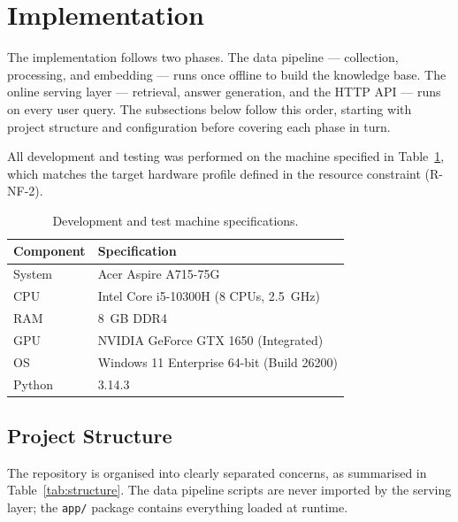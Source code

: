 \section{Implementation}
\label{sec:impl}

The implementation follows two phases. The data pipeline --- collection,
processing, and embedding --- runs once offline to build the knowledge base.
The online serving layer --- retrieval, answer generation, and the HTTP API
--- runs on every user query. The subsections below follow this order,
starting with project structure and configuration before covering each
phase in turn.

All development and testing was performed on the machine specified in
Table~\ref{tab:dev-machine}, which matches the target hardware profile
defined in the resource constraint (R-NF-2).


\begin{table}[H]
    \centering
    \begin{tabular}{|m{}|m{}|}
        \hline
        \textbf{Component} & \textbf{Specification} \\
        \hline\hline
        System     & Acer Aspire A715-75G \\
        \hline
        CPU        & Intel Core i5-10300H (8 CPUs, 2.5~GHz) \\
        \hline
        RAM        & 8~GB DDR4 \\
        \hline
        GPU        & NVIDIA GeForce GTX 1650 (Integrated) \\
        \hline
        OS         & Windows 11 Enterprise 64-bit (Build 26200) \\
        \hline
        Python     & 3.14.3 \\
        \hline
    \end{tabular}
    \caption{Development and test machine specifications.}
    \label{tab:dev-machine}
\end{table}


\subsection{Project Structure}
\label{sec:impl-structure}

The repository is organised into clearly separated concerns, as summarised in
Table~\ref{tab:structure}. The data pipeline scripts are never imported by the
serving layer; the \texttt{app/} package contains everything loaded at runtime.

